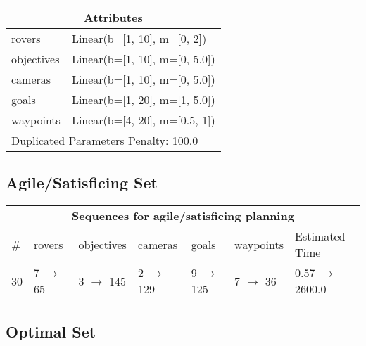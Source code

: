 \documentclass{article}
\begin{document}
                    \begin{center}
                    \begin{tabular}{p{}p{}}
                    \multicolumn{2}{c}{\bf \large Attributes}\\\midrule
                    rovers & Linear(b=[1, 10], m=[0, 2])\\
objectives & Linear(b=[1, 10], m=[0, 5.0])\\
cameras & Linear(b=[1, 10], m=[0, 5.0])\\
goals & Linear(b=[1, 20], m=[1, 5.0])\\
waypoints & Linear(b=[4, 20], m=[0.5, 1])
                    
                     \\\midrule
                    \multicolumn{2}{l}{Duplicated Parameters Penalty: 100.0}
                    \end{tabular}
                    \end{center}
                
                         \subsection*{Agile/Satisficing Set}

                        \begin{center}
                        \begin{tabular}{l|l|l|l|l|l|l}
                        \multicolumn{7}{c}{\bf \large Sequences for agile/satisficing planning}\\
                        \# & rovers & objectives & cameras & goals & waypoints & Estimated Time\\\midrule
                        30&7 $\rightarrow$ 65&3 $\rightarrow$ 145&2 $\rightarrow$ 129&9 $\rightarrow$ 125&7 $\rightarrow$ 36&0.57 $\rightarrow$ 2600.0
                        \end{tabular}
                        \end{center}
                    
                            \subsection*{Optimal Set}
\end{document}

